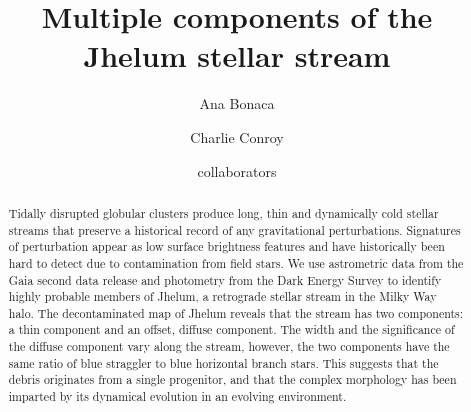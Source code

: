 \documentclass[twocolumn]{aastex62}
\begin{document}
\sloppy\sloppypar\raggedbottom\frenchspacing %

\title{Multiple components of the Jhelum stellar stream}


\author[0000-0002-7846-9787]{Ana Bonaca}

\author[0000-0002-1590-8551]{Charlie Conroy}

\author{collaborators}



\begin{abstract}\noindent %
Tidally disrupted globular clusters produce long, thin and dynamically cold stellar streams that preserve a historical record of any gravitational perturbations.
Signatures of perturbation appear as low surface brightness features and have historically been hard to detect due to contamination from field stars.
We use astrometric data from the Gaia second data release and photometry from the Dark Energy Survey to identify highly probable members of Jhelum, a retrograde stellar stream in the Milky Way halo.
The decontaminated map of Jhelum reveals that the stream has two components: a thin component and an offset, diffuse component.
The width and the significance of the diffuse component vary along the stream, however, the two components have the same ratio of blue straggler to blue horizontal branch stars.
This suggests that the debris originates from a single progenitor, and that the complex morphology has been imparted by its dynamical evolution in an evolving environment.
\end{abstract}

\end{document}
